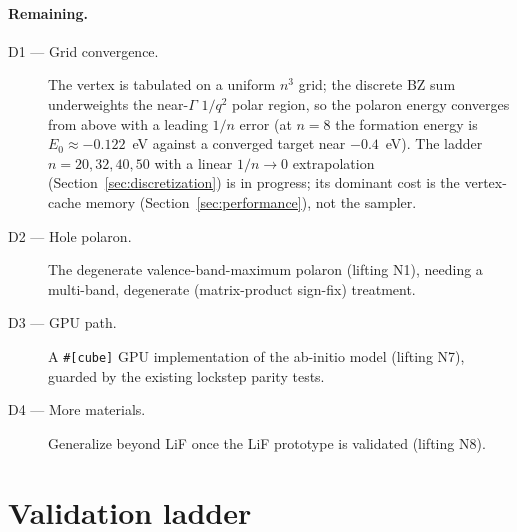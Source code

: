 \documentclass[11pt]{article}
\begin{document}
\paragraph{Remaining.}
\begin{description}
  \item[D1 --- Grid convergence.] The vertex is tabulated on a uniform $n^{3}$ grid; the
    discrete BZ sum underweights the near-$\Gamma$ $1/q^{2}$ polar region, so the polaron
    energy converges from above with a leading $1/n$ error (at $n{=}8$ the formation energy
    is $E_{0}\approx-0.122$~eV against a converged target near $-0.4$~eV). The ladder
    $n=20,32,40,50$ with a linear $1/n\to0$ extrapolation
    (Section~\ref{sec:discretization}) is in progress; its dominant cost is the vertex-cache
    memory (Section~\ref{sec:performance}), not the sampler.

  \item[D2 --- Hole polaron.] The degenerate valence-band-maximum polaron (lifting N1),
    needing a multi-band, degenerate (matrix-product sign-fix) treatment.

  \item[D3 --- GPU path.] A \texttt{\#[cube]} GPU implementation of the ab-initio model
    (lifting N7), guarded by the existing lockstep parity tests.

  \item[D4 --- More materials.] Generalize beyond LiF once the LiF prototype is validated
    (lifting N8).
\end{description}

\section{Validation ladder}
\label{sec:validation}
\end{document}
